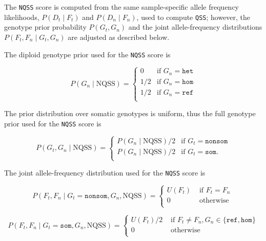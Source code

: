 \documentclass{article}
\begin{document}
The \texttt{NQSS} score is computed from the same sample-specific allele frequency likelihoods, $P(D_t \mid F_t)$ and $P(D_n \mid F_n)$, used to compute \texttt{QSS}; however, the genotype prior probability $P(G_t, G_n)$ and the joint allele-frequency distributions $P(F_t,F_n \mid G_t,G_n)$ are adjusted as described below.

The diploid genotype prior used for the \texttt{NQSS} score is

\begin{equation*}
P(G_n\mid \text{NQSS})=
\begin{cases}
0 & \text{if } G_n = \texttt{het} \\
1/2 & \text{if } G_n = \texttt{hom} \\
1/2 & \text{if } G_n = \texttt{ref} \\
\end{cases}
\end{equation*}

The prior distribution over somatic genotypes is uniform, thus the full genotype prior used for the \texttt{NQSS} score is

\begin{equation*}
P(G_t, G_n \mid \text{NQSS}) =
\begin{cases}
P(G_n \mid \text{NQSS})/2 & \text{if } G_t = \texttt{nonsom} \\
P(G_n \mid \text{NQSS})/2 & \text{if } G_t = \texttt{som}. \\
\end{cases}
\end{equation*}


The joint allele-frequency distribution used for the \texttt{NQSS} score is

\begin{equation*}
P(F_t, F_n \mid G_t = \texttt{nonsom}, G_n, \text{NQSS})=
\begin{cases}
U(F_t) & \text{ if } F_t = F_n \\
0 & \text{ otherwise } \\
\end{cases}
\end{equation*}

\begin{equation*}
P(F_t, F_n \mid G_t = \texttt{som}, G_n, \text{NQSS})=
\begin{cases}
U(F_t)/2 & \text{ if } F_t \neq F_n, G_n \in \{\texttt{ref},\texttt{hom}\}  \\
0 & \text{ otherwise } \\
\end{cases}
\end{equation*}
\end{document}

